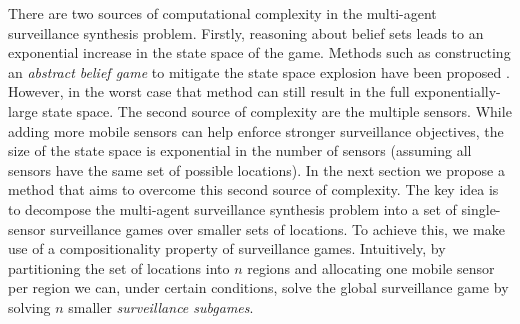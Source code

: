 There are two sources of computational complexity in the multi-agent surveillance synthesis problem. Firstly, reasoning about belief sets leads to an exponential increase in the state space of the game. Methods such as constructing an \emph{abstract belief game} to mitigate the state space explosion have been proposed \cite{}. However, in the worst case that method can still result in the full exponentially-large state space. The second source of complexity are the multiple sensors. While adding more mobile sensors can help enforce stronger surveillance objectives, the size of the state space is exponential in the number of sensors (assuming all sensors have the same set of possible locations). In the next section we propose a method that aims to overcome this second source of complexity. The key idea is to decompose the multi-agent surveillance synthesis problem into a set of single-sensor surveillance games over smaller sets of locations. To achieve this, we make use of a compositionality property of surveillance games. Intuitively, by partitioning the set of locations into $n$ regions and allocating one mobile sensor per region we can, under certain conditions, solve the global surveillance game by solving $n$ smaller \emph{surveillance subgames}. 